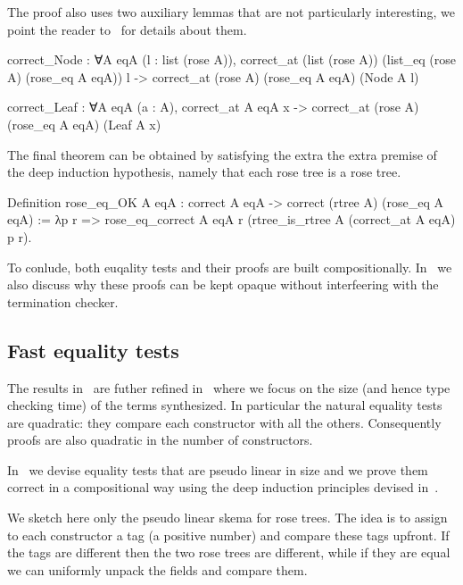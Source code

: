 \documentclass[a4paper, 11pt]{book}
\begin{document}
The proof also uses two auxiliary lemmas that are not particularly interesting,
we point the reader to~\cite{tassi:hal-01897468} for details about them.

\begin{rocqcode}
correct_Node : ∀A eqA (l : list (rose A)),
  correct_at (list (rose A)) (list_eq (rose A) (rose_eq A eqA)) l ->
    correct_at (rose A) (rose_eq A eqA) (Node A l)

correct_Leaf : ∀A eqA (a : A),
  correct_at A eqA x ->
    correct_at (rose A) (rose_eq A eqA) (Leaf A x)
  \end{rocqcode}
  
The final theorem can be obtained by satisfying the extra the extra
premise of the deep induction hypothesis, namely that each rose tree
is a rose tree.

\begin{rocqcode}
Definition rose_eq_OK A eqA :
  correct A eqA -> correct (rtree A) (rose_eq A eqA)
:=
  λp r =>
    rose_eq_correct A eqA
      r (rtree_is_rtree A (correct_at A eqA) p r).
\end{rocqcode}

To conlude, both euqality tests and their proofs are built compositionally.
In~\cite{tassi:hal-01897468} we also discuss why these proofs can be kept opaque
without interfeering with the termination checker.

\subsection{Fast equality tests}

The results in~\cite{tassi:hal-01897468} are futher refined in~\cite{gregoire:hal-03800154}
where we focus on the size (and hence type checking time) of the terms
synthesized. In particular the natural equality tests are quadratic: they
compare each constructor with all the others. Consequently proofs are also
quadratic in the number of constructors.

In~\cite{gregoire:hal-03800154} we devise equality tests that are pseudo
linear in size and we prove them correct in a compositional way using the deep
induction principles devised in~\cite{tassi:hal-01897468}.

We sketch here only the pseudo linear skema for rose trees. The idea
is to assign to each constructor a tag (a positive number) and
compare these tags upfront. If the tags are different then
the two rose trees are different, while if they are equal we can
uniformly unpack the fields and compare them.
\end{document}
